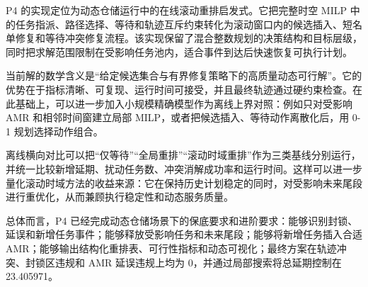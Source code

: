 P4 的实现定位为动态仓储运行中的在线滚动重排启发式。它把完整时空 MILP 中的任务指派、路径选择、等待和轨迹互斥约束转化为滚动窗口内的候选插入、短名单修复和等待冲突修复流程。该实现保留了混合整数规划的决策结构和目标层级，同时把求解范围限制在受影响任务池内，适合事件到达后快速恢复可执行计划。

当前解的数学含义是“给定候选集合与有界修复策略下的高质量动态可行解”。它的优势在于指标清晰、可复现、运行时间可接受，并且最终轨迹通过硬约束检查。在此基础上，可以进一步加入小规模精确模型作为离线上界对照：例如只对受影响 AMR 和相邻时间窗建立局部 MILP，或者把候选插入、等待动作离散化后，用 0-1 规划选择动作组合。

离线横向对比可以把“仅等待”“全局重排”“滚动时域重排”作为三类基线分别运行，并统一比较新增延期、扰动任务数、冲突消解成功率和运行时间。这样可以进一步量化滚动时域方法的收益来源：它在保持历史计划稳定的同时，对受影响未来尾段进行重优化，从而兼顾执行稳定性和动态服务质量。

总体而言，P4 已经完成动态仓储场景下的保底要求和进阶要求：能够识别封锁、延误和新增任务事件；能够释放受影响任务和未来尾段；能够将新增任务插入合适 AMR；能够输出结构化重排表、可行性指标和动态可视化；最终方案在轨迹冲突、封锁区违规和 AMR 延误违规上均为 0，并通过局部搜索将总延期控制在 23.405971。

